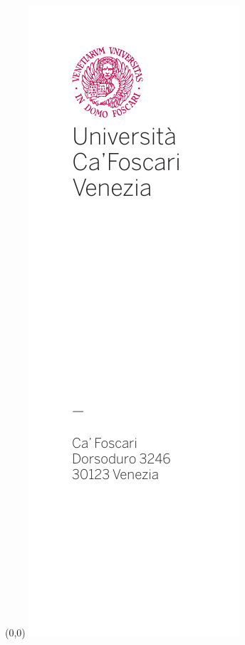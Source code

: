 \thispagestyle{empty}
\setlength{\TPHorizModule}{1mm}
\setlength{\TPVertModule}{1mm}

\begingroup
  \fontsize{11pt}{11pt}\selectfont
  \linespread{1.05}

  \begin{textblock}{50}(0,0)
  \noindent \includegraphics{gfx/00_cafoscari}
  \noindent \end{textblock}
  ~
